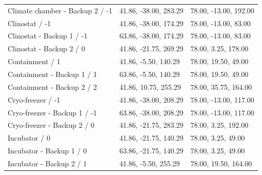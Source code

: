 \begin{longtable}{p{}p{}p{}}
Climate chamber - Backup 2 /\allowbreak{} -1 & 41.\allowbreak{}86, -38.\allowbreak{}00, 283.\allowbreak{}29 & 78.\allowbreak{}00, -13.\allowbreak{}00, 192.\allowbreak{}00 \\
Clinostat /\allowbreak{} -1 & 41.\allowbreak{}86, -38.\allowbreak{}00, 174.\allowbreak{}29 & 78.\allowbreak{}00, -13.\allowbreak{}00, 83.\allowbreak{}00 \\
Clinostat - Backup 1 /\allowbreak{} -1 & 63.\allowbreak{}86, -38.\allowbreak{}00, 174.\allowbreak{}29 & 78.\allowbreak{}00, -13.\allowbreak{}00, 83.\allowbreak{}00 \\
Clinostat - Backup 2 /\allowbreak{} 0 & 41.\allowbreak{}86, -21.\allowbreak{}75, 269.\allowbreak{}29 & 78.\allowbreak{}00, 3.\allowbreak{}25, 178.\allowbreak{}00 \\
Containment /\allowbreak{} 1 & 41.\allowbreak{}86, -5.\allowbreak{}50, 140.\allowbreak{}29 & 78.\allowbreak{}00, 19.\allowbreak{}50, 49.\allowbreak{}00 \\
Containment - Backup 1 /\allowbreak{} 1 & 63.\allowbreak{}86, -5.\allowbreak{}50, 140.\allowbreak{}29 & 78.\allowbreak{}00, 19.\allowbreak{}50, 49.\allowbreak{}00 \\
Containment - Backup 2 /\allowbreak{} 2 & 41.\allowbreak{}86, 10.\allowbreak{}75, 255.\allowbreak{}29 & 78.\allowbreak{}00, 35.\allowbreak{}75, 164.\allowbreak{}00 \\
Cryo-freezer /\allowbreak{} -1 & 41.\allowbreak{}86, -38.\allowbreak{}00, 208.\allowbreak{}29 & 78.\allowbreak{}00, -13.\allowbreak{}00, 117.\allowbreak{}00 \\
Cryo-freezer - Backup 1 /\allowbreak{} -1 & 63.\allowbreak{}86, -38.\allowbreak{}00, 208.\allowbreak{}29 & 78.\allowbreak{}00, -13.\allowbreak{}00, 117.\allowbreak{}00 \\
Cryo-freezer - Backup 2 /\allowbreak{} 0 & 41.\allowbreak{}86, -21.\allowbreak{}75, 283.\allowbreak{}29 & 78.\allowbreak{}00, 3.\allowbreak{}25, 192.\allowbreak{}00 \\
Incubator /\allowbreak{} 0 & 41.\allowbreak{}86, -21.\allowbreak{}75, 140.\allowbreak{}29 & 78.\allowbreak{}00, 3.\allowbreak{}25, 49.\allowbreak{}00 \\
Incubator - Backup 1 /\allowbreak{} 0 & 63.\allowbreak{}86, -21.\allowbreak{}75, 140.\allowbreak{}29 & 78.\allowbreak{}00, 3.\allowbreak{}25, 49.\allowbreak{}00 \\
Incubator - Backup 2 /\allowbreak{} 1 & 41.\allowbreak{}86, -5.\allowbreak{}50, 255.\allowbreak{}29 & 78.\allowbreak{}00, 19.\allowbreak{}50, 164.\allowbreak{}00 \\

\end{longtable}
